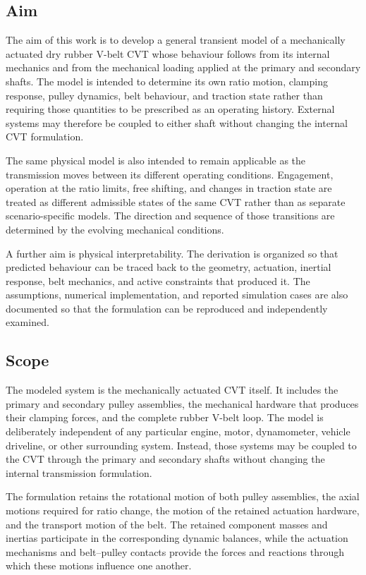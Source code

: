 \documentclass[11pt]{report}
\numberwithin{equation}{section}
\newcounter{assump}
\begin{document}
\subsection{Aim}
\label{sec:aim}

The aim of this work is to develop a general transient model of a mechanically
actuated dry rubber V-belt CVT whose behaviour follows from its internal
mechanics and from the mechanical loading applied at the primary and secondary
shafts. The model is intended to determine its own ratio motion, clamping
response, pulley dynamics, belt behaviour, and traction state rather than
requiring those quantities to be prescribed as an operating history. External
systems may therefore be coupled to either shaft without changing the internal
CVT formulation.

The same physical model is also intended to remain applicable as the
transmission moves between its different operating conditions. Engagement,
operation at the ratio limits, free shifting, and changes in traction state are
treated as different admissible states of the same CVT rather than as separate
scenario-specific models. The direction and sequence of those transitions are
determined by the evolving mechanical conditions.

A further aim is physical interpretability. The derivation is organized so
that predicted behaviour can be traced back to the geometry, actuation,
inertial response, belt mechanics, and active constraints that produced it. The
assumptions, numerical implementation, and reported simulation cases are also
documented so that the formulation can be reproduced and independently
examined.

\subsection{Scope}
\label{sec:scope}

The modeled system is the mechanically actuated CVT itself. It includes the
primary and secondary pulley assemblies, the mechanical hardware that produces
their clamping forces, and the complete rubber V-belt loop. The model is
deliberately independent of any particular engine, motor, dynamometer, vehicle
driveline, or other surrounding system. Instead, those systems may be coupled
to the CVT through the primary and secondary shafts without changing the
internal transmission formulation.

The formulation retains the rotational motion of both pulley assemblies, the
axial motions required for ratio change, the motion of the retained actuation
hardware, and the transport motion of the belt. The retained component masses
and inertias participate in the corresponding dynamic balances, while the
actuation mechanisms and belt--pulley contacts provide the forces and reactions
through which these motions influence one another.
\end{document}

